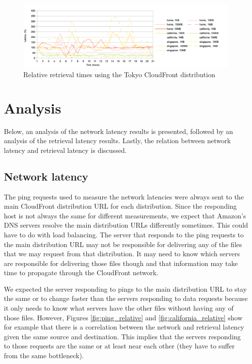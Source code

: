 \documentclass[conference]{IEEEtran}
\begin{document}
\begin{figure}[]
    \centering
    \includegraphics[width=\linewidth]{images/tokyo_relative.png}
    \caption[]{Relative retrieval times using the Tokyo CloudFront distribution}
    \label{fig:tokyo_relative}
\end{figure}


\section{Analysis}
Below, an analysis of the network latency results is presented, followed by an analysis of the retrieval latency results. Lastly, the relation between network latency and retrieval latency is discussed.

\subsection{Network latency}
The ping requests used to measure the network latencies were always sent to the main CloudFront distribution URL for each distribution. Since the responding host is not always the same for different measurements, we expect that Amazon's DNS servers resolve the main distribution URLs differently sometimes. This could have to do with load balancing. The server that responds to the ping requests to the main distribution URL may not be responsible for delivering any of the files that we may request from that distribution. It may need to know which servers are responsible for delivering those files though and that information may take time to propagate through the CloudFront network.

We expected the server responding to pings to the main distribution URL to stay the same or to change faster than the servers responding to data requests because it only needs to know what servers have the other files without having any of those files. However, Figures \ref{fig:ping_relative} and \ref{fig:california_relative} show for example that there is a correlation between the network and retrieval latency given the same source and destination. This implies that the servers responding to those requests are the same or at least near each other (they have to suffer from the same bottleneck).
\end{document}
